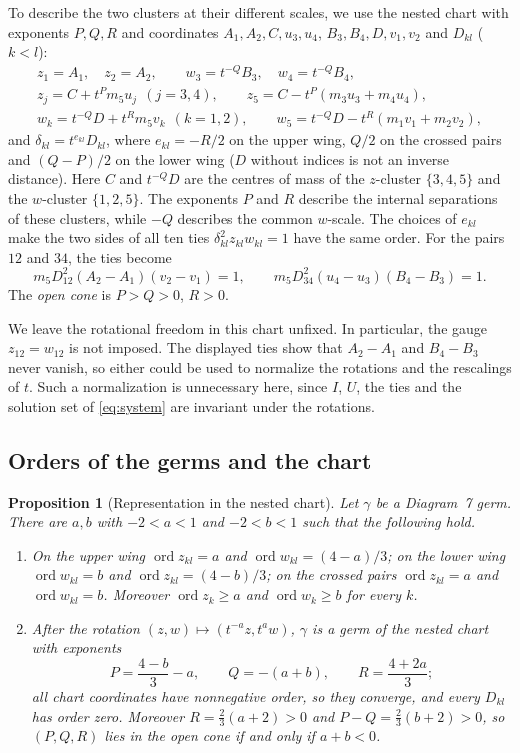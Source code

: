 \documentclass[11pt]{amsart}
\newenvironment{romanlist}{\begin{enumerate}\renewcommand{\labelenumi}{(\roman{enumi})}%
  \renewcommand{\theenumi}{\roman{enumi}}}{\end{enumerate}}
\newtheorem{proposition}[theorem]{Proposition}
\theoremstyle{definition}
\theoremstyle{remark}
\newcommand{\ord}{\operatorname{ord}}
\begin{document}
To describe the two clusters at their different scales, we use the nested chart
with exponents $P,Q,R$ and coordinates $A_1,A_2,C,u_3,u_4$,
$B_3,B_4,D,v_1,v_2$ and $D_{kl}$ ($k<l$):
\begin{gather*}
  z_1=A_1,\quad z_2=A_2,\qquad w_3=t^{-Q}B_3,\quad w_4=t^{-Q}B_4,\\
  z_j=C+t^Pm_5u_j\ \ (j=3,4),\qquad z_5=C-t^P(m_3u_3+m_4u_4),\\
  w_k=t^{-Q}D+t^Rm_5v_k\ \ (k=1,2),\qquad w_5=t^{-Q}D-t^R(m_1v_1+m_2v_2),
\end{gather*}
and $\delta_{kl}=t^{e_{kl}}D_{kl}$, where $e_{kl}=-R/2$ on the upper wing, $Q/2$ on the crossed
pairs and $(Q-P)/2$ on the lower wing ($D$ without indices is not an inverse distance).
Here $C$ and $t^{-Q}D$ are the centres of mass of the $z$-cluster $\{3,4,5\}$ and
the $w$-cluster $\{1,2,5\}$.  The exponents $P$ and $R$ describe the internal separations
of these clusters, while $-Q$ describes the common $w$-scale.  The choices of $e_{kl}$
make the two sides of all ten ties $\delta_{kl}^2z_{kl}w_{kl}=1$ have the same order.
For the pairs $12$ and $34$, the ties become
\[
  m_5D_{12}^2(A_2-A_1)(v_2-v_1)=1,\qquad m_5D_{34}^2(u_4-u_3)(B_4-B_3)=1.
\]
The \emph{open cone} is $P>Q>0$, $R>0$.

We leave the rotational freedom in this chart unfixed.  In particular, the gauge
$z_{12}=w_{12}$ is not imposed.  The displayed ties show that $A_2-A_1$ and $B_4-B_3$
never vanish, so either could be used to normalize the rotations and the rescalings of
$t$.  Such a normalization is unnecessary here, since $I$, $U$, the ties and the solution
set of \eqref{eq:system} are invariant under the rotations.

\subsection{Orders of the germs and the chart}

\begin{proposition}[Representation in the nested chart]\label{d7-cover}
Let $\gamma$ be a Diagram~7 germ.  There are $a,b$ with $-2<a<1$ and $-2<b<1$ such that the
following hold.
\begin{romanlist}
  \item On the upper wing $\ord z_{kl}=a$ and $\ord w_{kl}=(4-a)/3$; on the lower wing
  $\ord w_{kl}=b$ and $\ord z_{kl}=(4-b)/3$; on the crossed pairs $\ord z_{kl}=a$ and
  $\ord w_{kl}=b$.  Moreover $\ord z_k\ge a$ and $\ord w_k\ge b$ for every $k$.
  \item After the rotation $(z,w)\mapsto(t^{-a}z,t^{a}w)$, $\gamma$ is a germ of the nested
  chart with exponents
  \[
    P=\frac{4-b}{3}-a,\qquad Q=-(a+b),\qquad R=\frac{4+2a}{3};
  \]
  all chart coordinates have nonnegative order, so they converge, and every $D_{kl}$ has order
  zero.  Moreover $R=\frac23(a+2)>0$ and $P-Q=\frac23(b+2)>0$, so $(P,Q,R)$ lies in the open
  cone if and only if $a+b<0$.
\end{romanlist}
\end{proposition}
\end{document}
